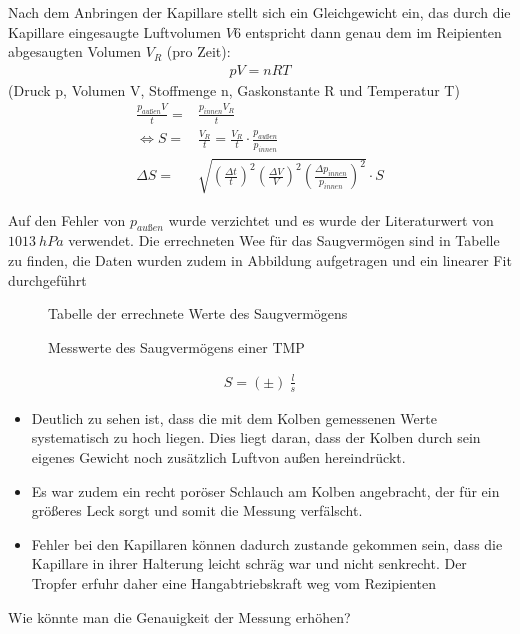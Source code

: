 \documentclass[12pt, a4paper]{scrartcl}
\begin{document}
        Nach dem Anbringen der Kapillare stellt sich ein Gleichgewicht ein, das durch die Kapillare eingesaugte Luftvolumen $V6$ entspricht dann genau dem im Reipienten abgesaugten Volumen $V_R$ (pro Zeit):
        \begin{align}
            pV=nRT
        \end{align}
        (Druck p, Volumen V, Stoffmenge n, Gaskonstante R und Temperatur T)
        \begin{align}
            \frac{p_{außen}V}{t} =& \frac{p_{innen}V_R}{t}\\
            \Leftrightarrow S=&\frac{V_R}{t}=\frac{V_R}{t}\cdot \frac{p_{außen}}{p_{innen}}\\
            \Delta S=&\sqrt{
                (\frac{\Delta t}t)^2
                (\frac{\Delta V}V)^2
                (\frac{\Delta p_{innen}}{p_{innen}})^2
            }\cdot S
        \end{align}
	
        Auf den Fehler von $p_{außen}$ wurde verzichtet und es wurde der Literaturwert von $1013\ hPa$ verwendet.
        Die errechneten Wee für das Saugvermögen sind in Tabelle
        zu finden, die Daten wurden zudem in Abbildung
        aufgetragen und ein linearer Fit durchgeführt
        
        \begin{figure}[H]
            \centering
            \caption{Tabelle der errechnete Werte des Saugvermögens}
        \end{figure}
    
        \begin{figure}[H]
            \centering
            \caption{Messwerte des Saugvermögens einer TMP}
        \end{figure}
        
        \begin{align*}
            S=(\pm)\ \frac{l}{s}
        \end{align*}
        
        \begin{itemize}
            \item Deutlich zu sehen ist, dass die mit dem Kolben gemessenen Werte systematisch zu hoch liegen. Dies liegt daran, dass der Kolben durch sein eigenes Gewicht noch zusätzlich Luftvon außen hereindrückt.
            
            \item Es war zudem ein recht poröser Schlauch am Kolben angebracht, der für ein größeres Leck sorgt und somit die Messung verfälscht.
            
            \item Fehler bei den Kapillaren können dadurch zustande gekommen sein, dass die Kapillare in ihrer Halterung leicht schräg war und nicht senkrecht. Der Tropfer erfuhr daher eine Hangabtriebskraft weg vom Rezipienten
        \end{itemize}
        Wie könnte man die Genauigkeit der Messung erhöhen?
        
\end{document}
